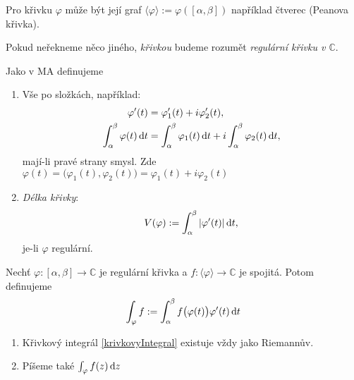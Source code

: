 \begin{note}
Pro křivku $\varphi$ může být její graf $\langle\varphi\rangle:=\varphi([\alpha,\beta])$ například čtverec (Peanova křivka).
\end{note}

\begin{agreement}
Pokud neřekneme něco jiného, \emph{křivkou} budeme rozumět \emph{regulární křivku v $\mathbb{C}$}.
\end{agreement}

\begin{reminder}
Jako v MA definujeme
\begin{enumerate}
    \item Vše po složkách, například:
    \begin{align*}
        \varphi'(t)&=\varphi'_1(t)+i\varphi'_2(t),\\
        \int_\alpha^\beta\varphi(t)\mathop{}\!\mathrm{d} t &=\int_\alpha^\beta\varphi_1(t)\mathop{}\!\mathrm{d} t +i\int_\alpha^\beta\varphi_2(t)\mathop{}\!\mathrm{d} t,
    \end{align*}
    mají-li pravé strany smysl. Zde $\varphi(t)=\big(\varphi_1(t),\varphi_2(t)\big)=\varphi_1(t)+i\varphi_2(t)$
    \item \emph{Délka křivky}: \[V(\varphi):=\int_\alpha^\beta|\varphi'(t)|\mathop{}\!\mathrm{d} t,\] je-li $\varphi$ regulární.
\end{enumerate}
\end{reminder}
\begin{definition}
Nechť $\varphi:[\alpha,\beta]\rightarrow\mathbb{C}$ je regulární křivka a $f:\langle\varphi\rangle\rightarrow\mathbb{C}$ je spojitá. Potom definujeme
\begin{equation}\label{krivkovyIntegral}
    \int_\varphi f:=\int_\alpha^\beta f\big(\varphi(t)\big)\varphi'(t)\mathop{}\!\mathrm{d} t
\end{equation}
\end{definition}
\begin{note}
\mbox{} %
\begin{enumerate}
    \item Křivkový integrál \cref{krivkovyIntegral} existuje vždy jako Riemannův.
    \item Píšeme také $\int_\varphi f(z)\mathop{}\!\mathrm{d} z$
\end{enumerate}
\end{note}

